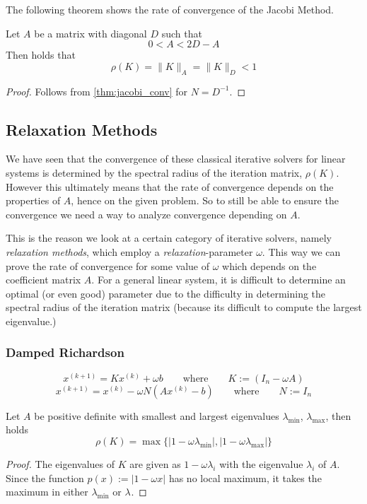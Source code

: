 The following theorem shows the rate of convergence of the Jacobi Method.
\begin{theorem}\label{cor:jacobi_conv}
   Let \(A\) be a matrix with diagonal \(D\) such that
   \[0 < A < 2D - A\]
   Then holds that
   \[\rho(K) = \|K\|_A = \|K\|_D < 1\]
\end{theorem}
\begin{proof}
   Follows from \cref{thm:jacobi_conv} for \(N = D^{-1}\).
\end{proof}

\subsection{Relaxation Methods}
We have seen that the convergence of these classical iterative solvers for linear systems is determined by the spectral radius of the iteration matrix, \(\rho(K)\).
However this ultimately means that the rate of convergence depends on the properties of \(A\), hence on the given problem.
So to still be able to ensure the convergence we need a way to analyze convergence depending on \(A\).

This is the reason we look at a certain category of iterative solvers, namely \emph{relaxation methods}, which employ a \emph{relaxation}-parameter \(\omega\).
This way we can prove the rate of convergence for some value of \(\omega\) which depends on the coefficient matrix \(A\).
For a general linear system, it is difficult to determine an optimal (or even good) parameter due to the difficulty in determining the spectral radius of the iteration matrix (because its difficult to compute the largest eigenvalue.)

\subsubsection{Damped Richardson}
\begin{definition}
   \[x^{(k+1)} = Kx^{(k)} + \omega b \qquad\text{where}\qquad K := (I_n - \omega A)\]
   \[x^{(k+1)} = x^{(k)} - \omega N(Ax^{(k)} - b) \qquad\text{where}\qquad N := I_n\]
\end{definition}



\begin{lemma}\label{lem:spec_rad_rich}
   Let \(A\) be positive definite with smallest and largest eigenvalues \(\lambda_{\min}\), \(\lambda_{\max}\), then holds
   \[\rho(K) = \max\{|1 - \omega \lambda_{\min}|, |1 - \omega \lambda_{\max}|\}\]
\end{lemma}
\begin{proof}
   The eigenvalues of \(K\) are given as \(1 - \omega \lambda_i\) with the eigenvalue \(\lambda_i\) of \(A\).
   Since the function \(p(x) := |1 - \omega x|\) has no local maximum, it takes the maximum in either \(\lambda_{\min}\) or \(\lambda_{}\).
\end{proof}

